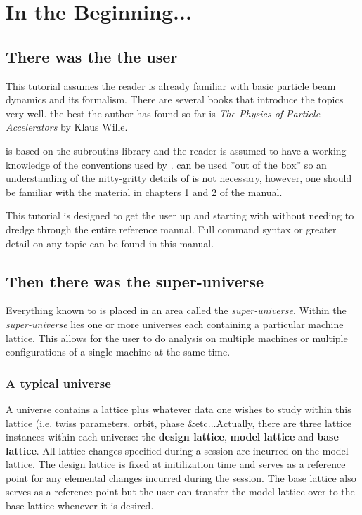 \documentclass{book}
\begin{document}
\chapter{In the Beginning...}
\label{c:beginning}

\section{There was the the user}

This tutorial assumes the reader is already familiar with basic particle beam
dynamics and its formalism. There are several books that introduce the topics
very well. the best the author has found so far is \textit{The Physics of
Particle Accelerators} by Klaus Wille. 

\tao is based on the \bmad subroutins library and the reader is assumed to have
a working knowledge of the conventions used by \bmad. \tao can be used ''out of
the box'' so an understanding of the nitty-gritty details of \bmad is not
necessary, however, one should be familiar with the material in chapters 1 and 2
of the \bmad manual.


This tutorial is designed to get the user up and starting with \tao without
needing to dredge through the entire reference manual. Full command syntax
or greater detail on any topic can be found in this manual.

\section{Then there was the super-universe}

Everything known to \tao is placed in an area called the
\textit{super-universe}. Within the \textit{super-universe} lies one or more
universes each containing a particular machine lattice. This allows for the user
to do analysis on multiple machines or multiple configurations of a single
machine at the same time. 

\subsection{A typical universe}
A universe contains a \bmad lattice plus whatever data one wishes to study
within this lattice (i.e. twiss parameters, orbit, phase \&etc...\. Actually,
there are three lattice instances within each universe: the \textbf{design
lattice}, \textbf{model lattice} and \textbf{base lattice}. All lattice changes
specified during a session are incurred on the model lattice. The design lattice is
fixed at initilization time and serves as a reference point for any elemental
changes incurred during the \tao session. The base lattice also serves as a
reference point but the user can transfer the model lattice over to the base
lattice whenever it is desired.
\end{document}
